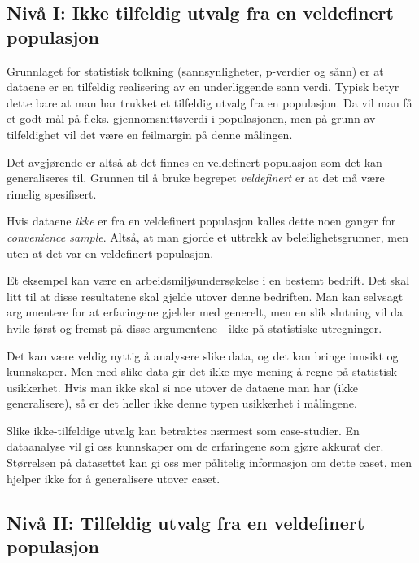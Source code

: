 \documentclass[
  letterpaper,
  DIV=11,
  numbers=noendperiod]{scrreprt}
\begin{document}
\hypertarget{nivuxe5-i-ikke-tilfeldig-utvalg-fra-en-veldefinert-populasjon}{%
\subsection{Nivå I: Ikke tilfeldig utvalg fra en veldefinert
populasjon}\label{nivuxe5-i-ikke-tilfeldig-utvalg-fra-en-veldefinert-populasjon}}

Grunnlaget for statistisk tolkning (sannsynligheter, p-verdier og sånn)
er at dataene er en tilfeldig realisering av en underliggende sann
verdi. Typisk betyr dette bare at man har trukket et tilfeldig utvalg
fra en populasjon. Da vil man få et godt mål på f.eks.
gjennomsnittsverdi i populasjonen, men på grunn av tilfeldighet vil det
være en feilmargin på denne målingen.

Det avgjørende er altså at det finnes en veldefinert populasjon som det
kan generaliseres til. Grunnen til å bruke begrepet \emph{veldefinert}
er at det må være rimelig spesifisert.

Hvis dataene \emph{ikke} er fra en veldefinert populasjon kalles dette
noen ganger for \emph{convenience sample}. Altså, at man gjorde et
uttrekk av beleilighetsgrunner, men uten at det var en veldefinert
populasjon.

Et eksempel kan være en arbeidsmiljøundersøkelse i en bestemt bedrift.
Det skal litt til at disse resultatene skal gjelde utover denne
bedriften. Man kan selvsagt argumentere for at erfaringene gjelder med
generelt, men en slik slutning vil da hvile først og fremst på disse
argumentene - ikke på statistiske utregninger.

Det kan være veldig nyttig å analysere slike data, og det kan bringe
innsikt og kunnskaper. Men med slike data gir det ikke mye mening å
regne på statistisk usikkerhet. Hvis man ikke skal si noe utover de
dataene man har (ikke generalisere), så er det heller ikke denne typen
usikkerhet i målingene.

Slike ikke-tilfeldige utvalg kan betraktes nærmest som case-studier. En
dataanalyse vil gi oss kunnskaper om de erfaringene som gjøre akkurat
der. Størrelsen på datasettet kan gi oss mer pålitelig informasjon om
dette caset, men hjelper ikke for å generalisere utover caset.

\hypertarget{nivuxe5-ii-tilfeldig-utvalg-fra-en-veldefinert-populasjon}{%
\subsection{Nivå II: Tilfeldig utvalg fra en veldefinert
populasjon}\label{nivuxe5-ii-tilfeldig-utvalg-fra-en-veldefinert-populasjon}}
\end{document}

